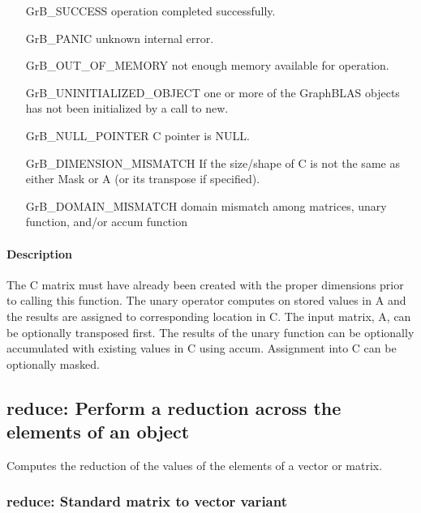 \begin{itemize}[leftmargin=2.1in]
\item[{\sf GrB\_SUCCESS}]     operation completed successfully.
\item[{\sf GrB\_PANIC}]        unknown internal error.

\item[{\sf GrB\_OUT\_OF\_MEMORY}]          not enough memory available for operation.
\item[{\sf GrB\_UNINITIALIZED\_OBJECT}]          one or more of the GraphBLAS objects has
                                    not been initialized by a call to {\sf new}.
\item[{\sf GrB\_NULL\_POINTER}]    {\sf C} pointer is {\sf NULL}.

\item[{\sf GrB\_DIMENSION\_MISMATCH}]            
        If the size/shape of {\sf C} is not the same as either {\sf Mask} or {\sf A} (or its transpose if specified).
\item[{\sf GrB\_DOMAIN\_MISMATCH}]  
        domain mismatch among matrices, unary function, and/or
        accum function 
\end{itemize}

\paragraph{Description}

The {\sf C} matrix must have already been created with the proper dimensions
prior to calling this function.  The unary operator computes on stored values in {\sf A} and the results are assigned to corresponding location in {\sf C}.
The input matrix, {\sf A}, can be optionally transposed first.  The results of the unary function can be optionally accumulated with existing values in {\sf C} using accum.  Assignment into {\sf C} can be optionally masked.


\subsection{{\sf reduce}: Perform a reduction across the elements of an object}

Computes the reduction of the values of the elements of a vector or matrix.

\subsubsection{{\sf reduce}: Standard matrix to vector variant}

